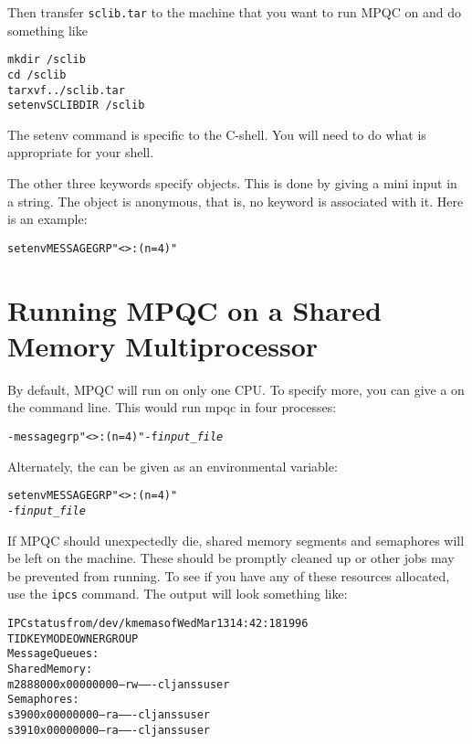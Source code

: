 Then transfer \verb|sclib.tar| to the machine that you want to run
MPQC on and do something like

\begin{alltt}
mkdir ~/sclib
cd ~/sclib
tar xvf ../sclib.tar
setenv SCLIBDIR ~/sclib
\end{alltt}

The setenv command is specific to the C-shell.  You will need to
do what is appropriate for your shell.

The other three keywords specify objects.  This is done by
giving a mini  input in a string.  The
object is anonymous, that is, no keyword is associated with it.
Here is an example:

\begin{alltt}
setenv MESSAGEGRP "<>:(n = 4)"
\end{alltt}

\section{Running MPQC on a Shared Memory Multiprocessor}

By default, MPQC will run on only one CPU.  To specify more, you can give a
  on the command line.
This would run mpqc in four processes:
\begin{alltt}
 {\ttfamily -messagegrp "<>:(n = 4)" -f} {\itshape input_file}
\end{alltt}

Alternately, the   can
be given as an environmental variable:
\begin{alltt}
{\ttfamily setenv MESSAGEGRP "<>:(n = 4)"}
 {\ttfamily -f} {\itshape input_file}
\end{alltt}

If MPQC should unexpectedly die, shared memory segments and
semaphores will be left on the machine.  These should be promptly
cleaned up or other jobs may be prevented from running.  To
see if you have any of these resources allocated, use the
\verb|ipcs| command.  The output will look something
like:

\begin{alltt}
IPC status from /dev/kmem as of Wed Mar 13 14:42:18 1996
T     ID     KEY        MODE       OWNER    GROUP
Message Queues:
Shared Memory:
m 288800 0x00000000 --rw-------  cljanss     user
Semaphores:
s    390 0x00000000 --ra-------  cljanss     user
s    391 0x00000000 --ra-------  cljanss     user
\end{alltt}

